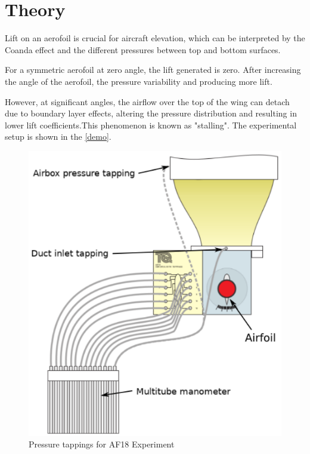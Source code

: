 \section{Theory}
\FloatBarrier %

Lift on an aerofoil is crucial for aircraft elevation, which can be interpreted by the Coanda effect and the different pressures between top and bottom surfaces. 

For a symmetric aerofoil at zero angle, the lift generated is zero. 
After increasing the angle of the aerofoil, the pressure variability and producing more lift. 

However, at significant angles, the airflow over the top of the wing can detach due to boundary layer effects, altering the pressure distribution and resulting in lower lift coefficients.This phenomenon is known as "stalling".
The experimental setup is shown in the \autoref{demo}.
\begin{figure}[htbp] %
    \centering
    \includegraphics[scale=0.3]{fig/AF18.png}
    \caption{Pressure tappings for AF18 Experiment}
    \label{demo}
\end{figure}
